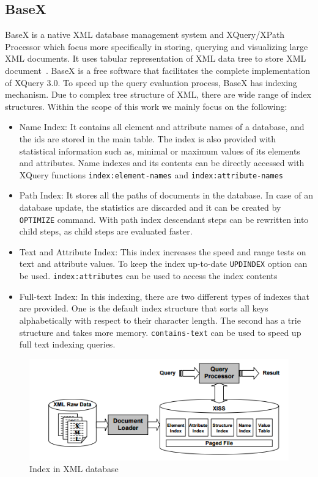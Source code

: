 	\subsection{BaseX}
	BaseX is a native XML database management system and XQuery/XPath Processor which focus  more specifically in storing, querying and visualizing large XML documents. It uses tabular representation of XML data tree to store XML document~\citep{www/basex}. BaseX is a free software that facilitates the complete implementation of XQuery 3.0. To speed up the query evaluation process, BaseX has indexing mechanism. Due to complex tree structure of XML, there are wide range of index structures. Within the scope of this work we mainly focus on the following:
	\begin{itemize}
	\item {Name Index:} It contains all element and attribute names of a database, and the ids are stored in the main table. The index is also provided with statistical information such as, minimal or maximum values of its elements and attributes. Name indexes and its contents can be directly accessed with XQuery functions \texttt{index:element-names} and \texttt{index:attribute-names}
	
	 \item{Path Index:} It stores all the paths of documents in the database. In case of an database update, the statistics are discarded and it can be created by \texttt{OPTIMIZE} command. With path index descendant steps can be rewritten into child steps, as child steps are evaluated faster.
	 
	 \item{Text and Attribute Index:} This index increases the speed and range tests on text and attribute values. To keep the index up-to-date \texttt{UPDINDEX} option can be used. \texttt{index:attributes} can be used to access the index contents
	  	 \item{Full-text Index:} In this indexing, there are two different types of indexes that are provided. One is the default index structure that sorts all keys alphabetically with respect to their character length. The second has a trie structure and takes more memory. \texttt{contains-text} can be used to speed up full text indexing queries.

\end{itemize}

	  	  	\begin{figure}[h]
    		\includegraphics[width=1\textwidth]{img/Indexing}
    		\caption{Index in XML database~\cite{li2001indexing}}
	\end{figure}

